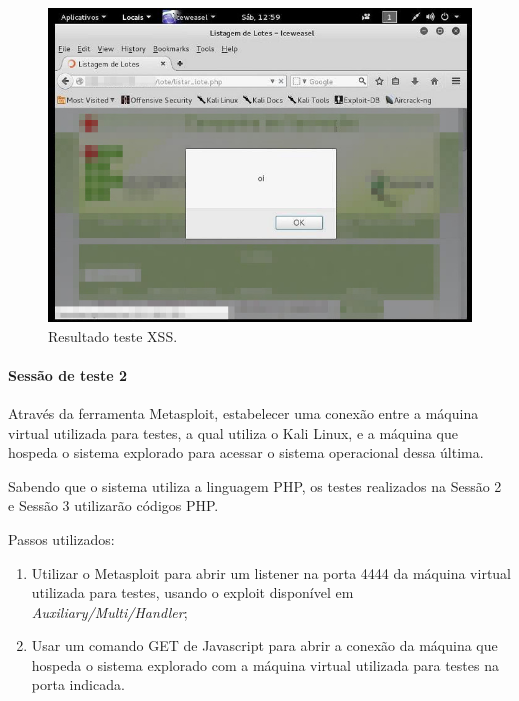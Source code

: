 \documentclass[
    12pt,               %
    openright,          %
    oneside,            %
    a4paper,            %
    section=TITLE,     %
    english,            %
    french,             %
    spanish,            %
    brazil              %
    ]{abntex2}
\begin{document}
\begin{figure}[htp]
\centering
\caption{Resultado teste XSS.}
\includegraphics[width=450px]{image17.jpeg}
\end{figure}
\ifdefined\FloatBarrier \FloatBarrier \fi



\paragraph*{Sessão de teste 2}

Através da ferramenta Metasploit, estabelecer uma conexão entre a máquina virtual utilizada para testes, a qual utiliza o Kali Linux, e a máquina que hospeda o sistema explorado para acessar o sistema operacional dessa última.


Sabendo que o sistema utiliza a linguagem PHP, os testes realizados na Sessão 2 e Sessão 3 utilizarão códigos PHP.


Passos utilizados:



\begin{enumerate}[start=1]
	
\item Utilizar o Metasploit para abrir um listener na porta 4444 da máquina virtual utilizada para testes, usando o exploit disponível em\emph{ Auxiliary/Multi/Handler};
	
\item Usar um comando GET de Javascript para abrir a conexão da máquina que hospeda o sistema explorado com a máquina virtual utilizada para testes na porta indicada.

\end{enumerate}
\end{document}

